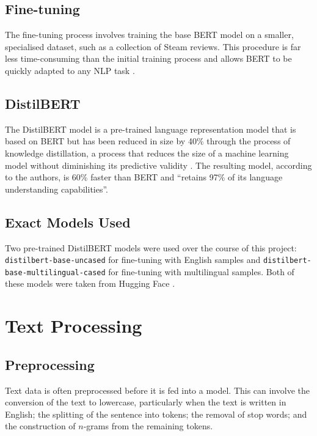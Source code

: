 \subsection{Fine-tuning}

The fine-tuning process involves training the base BERT model on a smaller, specialised dataset, such as a collection of Steam reviews. This procedure is far less time-consuming than the initial training process and allows BERT to be quickly adapted to any NLP task \cite{Devlin2018_BERT}.

\subsection{DistilBERT}

The DistilBERT model \cite{sanh2019distilbert} is a pre-trained language representation model that is based on BERT but has been reduced in size by 40\% through the process of knowledge distillation, a process that reduces the size of a machine learning model without diminishing its predictive validity \cite{hinton2015distilling}. The resulting model, according to the authors, is 60\% faster than BERT and ``retains 97\% of its language understanding capabilities''.

\subsection{Exact Models Used}

Two pre-trained DistilBERT models were used over the course of this project: \texttt{distilbert-base-uncased} \cite{HuggingFaceEng} for fine-tuning with English samples and \texttt{distilbert-base-multilingual-cased} \cite{HuggingFaceMulti} for fine-tuning with multilingual samples. Both of these models were taken from Hugging Face \cite{wolf2019huggingface}. 

\section{Text Processing}

\subsection{Preprocessing}

Text data is often preprocessed before it is fed into a model. This can involve the conversion of the text to lowercase, particularly when the text is written in English; the splitting of the sentence into tokens; the removal of stop words; and the construction of $n$-grams from the remaining tokens.

